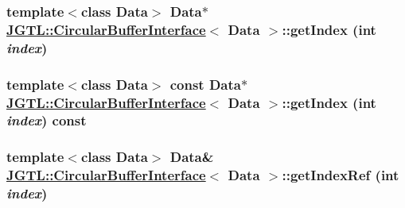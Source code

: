 \hypertarget{class_j_g_t_l_1_1_circular_buffer_interface_96e8cf943fc910b705845bf25e914a2c}{
\subsubsection[getIndex]{\setlength{\rightskip}{0pt plus 5cm}template$<$class Data$>$ Data$\ast$ \hyperlink{class_j_g_t_l_1_1_circular_buffer_interface}{JGTL::Circular\-Buffer\-Interface}$<$ Data $>$::get\-Index (int {\em index})}}
\label{class_j_g_t_l_1_1_circular_buffer_interface_96e8cf943fc910b705845bf25e914a2c}


\hypertarget{class_j_g_t_l_1_1_circular_buffer_interface_d142cb2356d7d40e8dad0d246414a862}{
\subsubsection[getIndex]{\setlength{\rightskip}{0pt plus 5cm}template$<$class Data$>$ const Data$\ast$ \hyperlink{class_j_g_t_l_1_1_circular_buffer_interface}{JGTL::Circular\-Buffer\-Interface}$<$ Data $>$::get\-Index (int {\em index}) const}}
\label{class_j_g_t_l_1_1_circular_buffer_interface_d142cb2356d7d40e8dad0d246414a862}


\hypertarget{class_j_g_t_l_1_1_circular_buffer_interface_3bcda10a314fbebd028ec4f7f6d536e7}{
\subsubsection[getIndexRef]{\setlength{\rightskip}{0pt plus 5cm}template$<$class Data$>$ Data\& \hyperlink{class_j_g_t_l_1_1_circular_buffer_interface}{JGTL::Circular\-Buffer\-Interface}$<$ Data $>$::get\-Index\-Ref (int {\em index})}}
\label{class_j_g_t_l_1_1_circular_buffer_interface_3bcda10a314fbebd028ec4f7f6d536e7}



